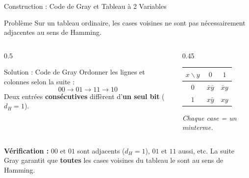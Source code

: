 \begin{frame}{Construction : Code de Gray et Tableau à 2 Variables}

    \begin{block}{Problème}
        Sur un tableau ordinaire, les cases voisines ne sont pas nécessairement adjacentes au sens de Hamming.
    \end{block}

    \vspace{0.3cm}

    \begin{columns}[T]
        \begin{column}{0.5\textwidth}
            \begin{alertblock}{Solution : Code de Gray}
                Ordonner les lignes et colonnes selon la suite :
                \[
                    00 \to 01 \to 11 \to 10
                \]
                Deux entrées \textbf{consécutives} diffèrent d'\textbf{un seul bit} (\(d_H = 1\)).
            \end{alertblock}
        \end{column}
        \begin{column}{0.45\textwidth}
            \centering
            \renewcommand{\arraystretch}{1.4}
            \begin{tabular}{|c|c|c|}
                \hline
                \(x \backslash y\) & \(0\) & \(1\) \\
                \hline
                \(0\) & \(\bar{x}\bar{y}\) & \(\bar{x}y\) \\
                \hline
                \(1\) & \(x\bar{y}\) & \(xy\) \\
                \hline
            \end{tabular}

            \vspace{0.3cm}
            \textit{Chaque case = un minterme.}
        \end{column}
    \end{columns}

    \vspace{0.4cm}

    \textbf{Vérification :} \(00\) et \(01\) sont adjacents (\(d_H=1\)), \(01\) et \(11\) aussi, etc. La suite Gray garantit que \textbf{toutes} les cases voisines du tableau le sont au sens de Hamming.

\end{frame}
